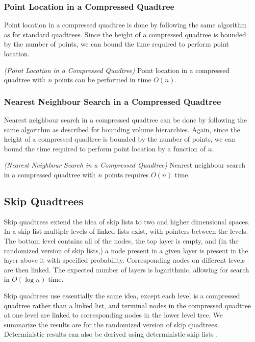 \documentclass[mcs]{scsthesis}
\begin{document}
\subsubsection{Point Location in a Compressed Quadtree}

Point location in a compressed quadtree is done by following the same algorithm
as for standard quadtrees. Since the height of a compressed quadtree is
bounded by the number of points, we can bound the time required to perform
point location.

\begin{thm} \emph{(Point Location in a Compressed Quadtree)} 
Point location in a compressed quadtree with $n$ points can be performed in
time \(O(n)\). 
\end{thm}

\subsubsection{Nearest Neighbour Search in a Compressed Quadtree}

Nearest neighbour search in a compressed quadtree can be done by following the
same algorithm as described for bounding volume hierarchies. Again, since the
height of a compressed quadtree is bounded by the number of points, we can bound
the time required to perform point location by a function of $n$.

\begin{thm} \emph{(Nearest Neighbour Search in a Compressed Quadtree)} 
Nearest neighbour search in a compressed quadtree with $n$ points requires
\(O(n)\) time.
\end{thm}

\subsection{Skip Quadtrees}

Skip quadtrees extend the idea of skip lists \cite{skiplist} to two and higher
dimensional spaces. In a skip list multiple levels of linked lists exist, with
pointers between the levels. The bottom level contains all of the nodes, the
top layer is empty, and (in the randomized version of skip lists,) a node
present in a given layer is present in the layer above it with specified
probability. Corresponding nodes on different levels are then linked. The
expected number of layers is logarithmic, allowing for search in \(O(\log n)\)
time.

Skip quadtrees use essentially the same idea, except each level is a
compressed quadtree rather than a linked list, and terminal nodes in the
compressed quadtree at one level are linked to corresponding nodes in the
lower level tree. We summarize the results are for the randomized version of
skip quadtrees. Deterministic results can also be derived using deterministic
skip lists \cite{skipquadtree}.
\end{document}
